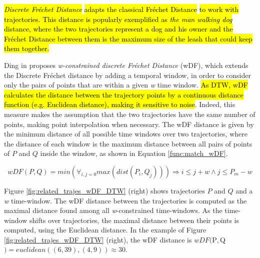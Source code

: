 \documentclass[12pt]{article}
\begin{document}
\hl{\emph{Discrete Fr{\'e}chet Distance} }\cite{eiter1994computing}\hl{adapts the classical Fr{\'e}chet Distance }\cite{Frechet1906}\hl{ to work with trajectories. This distance is popularly exemplified as \textit{the man walking dog} distance, where the two trajectories represent a dog and his owner and the Fr{\'e}chet Distance between them is the maximum size of the leash that could keep them together.}

Ding in \cite{Ding:2008:ESJ:1440463.1440989} proposes \emph{w-constrained discrete Fr{\'e}chet Distance} (wDF), which extends the Discrete Fr{\'e}chet distance \cite{eiter1994computing} by adding a temporal window, in order to consider only the pairs of points that are within a given \emph{w} time window. \hl{As DTW, wDF calculates the distance between the trajectory points by a continuous distance function (e.g. Euclidean distance), making it sensitive to noise}. Indeed, this measure makes the assumption that the two trajectories have the same number of points, making point interpolation when necessary. The wDF distance is given by the minimum distance of all possible time windows over two trajectories, where the distance of each window is the maximum distance between all pairs of points of $P$ and $Q$ inside the window, as shown in Equation \ref{func:match_wDF}.

\begin{equation}
\label{func:match_wDF}
  wDF(P, Q) = min(\forall_{i,j=0}max(dist(P_i, Q_j))) \Rightarrow i \leq j + w \land
  j \leq P_{m} - w
\end{equation}

Figure \ref{fig:related_trajes_wDF_DTW} (right) shows trajectories $P$ and $Q$ and a \emph{w} time-window. The wDF distance between the trajectories is computed as the maximal distance found among all \emph{w}-constrained time-windows. As the time-window shifts over trajectories, the maximal distance between their points is computed, using the Euclidean distance. In the example of Figure \ref{fig:related_trajes_wDF_DTW} (right), the wDF distance is $wDF($P$, $Q$) = euclidean((6,39), (4,9)) \approx 30$.
\end{document}
